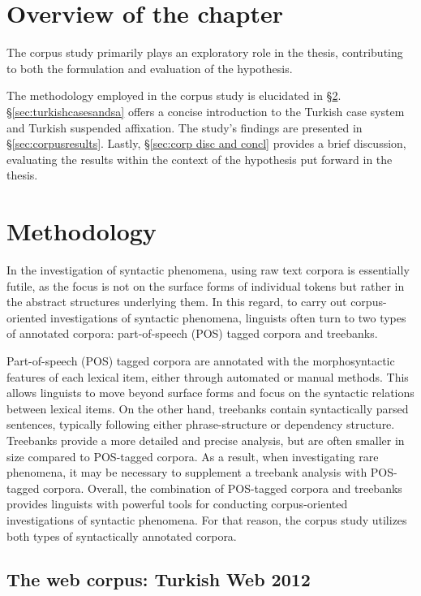 \section{Overview of the chapter}

The corpus study primarily plays an exploratory role in the thesis, contributing to both the formulation and evaluation of the hypothesis. 

The methodology employed in the corpus study is elucidated in \S \ref{sec:corpmethodology}. \S \ref{sec:turkishcasesandsa} offers a concise introduction to the Turkish case system and Turkish suspended affixation. The study's findings are presented in \S \ref{sec:corpusresults}. Lastly, \S \ref{sec:corp disc and concl} provides a brief discussion, evaluating the results within the context of the hypothesis put forward in the thesis.

\section{Methodology} \label{sec:corpmethodology}

In the investigation of syntactic phenomena, using raw text corpora is essentially futile, as the focus is not on the surface forms of individual tokens but rather in the abstract structures underlying them. In this regard, to carry out corpus-oriented investigations of syntactic phenomena, linguists often turn to two types of annotated corpora: part-of-speech (POS) tagged corpora and treebanks. 

Part-of-speech (POS) tagged corpora are annotated with the morphosyntactic features of each lexical item, either through automated or manual methods. This allows linguists to move beyond surface forms and focus on the syntactic relations between lexical items. On the other hand, treebanks contain syntactically parsed sentences, typically following either phrase-structure or dependency structure. Treebanks provide a more detailed and precise analysis, but are often smaller in size compared to POS-tagged corpora. As a result, when investigating rare phenomena, it may be necessary to supplement a treebank analysis with POS-tagged corpora. Overall, the combination of POS-tagged corpora and treebanks provides linguists with powerful tools for conducting corpus-oriented investigations of syntactic phenomena. For that reason, the corpus study utilizes both types of syntactically annotated corpora.

\subsection{The web corpus: Turkish Web 2012} 

